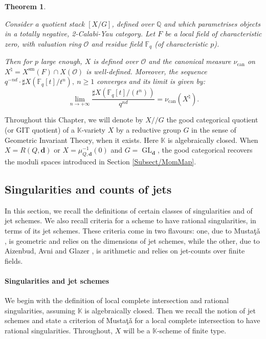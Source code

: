 \documentclass[11pt,english]{article}
\numberwithin{equation}{section}
\numberwithin{figure}{section}
\theoremstyle{definition}
\theoremstyle{plain}
\newtheorem{thm}[df]{Theorem}
\theoremstyle{remark}
\DeclareMathOperator{\GL}{GL}
\newcommand\dd{\mathbf{d}}
\newcommand\QQ{\mathbb{Q}}
\newcommand\FF{\mathbb{F}}
\newcommand\KK{\mathbb{K}}
\newcommand\git{/\!\!/}
\begin{document}
\begin{thm} \label{Thm/Ch3p-adicVol2CYMod}

Consider a quotient stack $[X/G]$, defined over $\QQ$ and which
parametrises objects in a totally negative, 2-Calabi-Yau category.
Let $F$ be a local field of characteristic zero, with valuation ring
$\mathcal{O}$ and residue field $\FF_{q}$ (of characteristic $p$).

Then for $p$ large enough, $X$ is defined over $\mathcal{O}$ and
the canonical measure $\nu_{\mathrm{can}}$ on $X^{\natural}=X^{\mathrm{sm}}(F)\cap X(\mathcal{O})$
is well-defined. Moreover, the sequence $q^{-nd}\cdot\sharp X(\mathbb{F}_{q}[t]/t^{n}),\ n\geq1$
converges and its limit is given by:\[
\underset{n\rightarrow +\infty}{\lim}\frac{\sharp X(\mathbb{F}_{q}[t]/(t^{n}))}{q^{nd}}
=
\nu_{\mathrm{can}}(X^{\natural}).
\]\end{thm}

Throughout this Chapter, we will denote by $X\git G$ the good categorical
quotient (or GIT quotient) \cite[\S 0.2, Rem. 6]{MFK94}\cite[\S 6.1.]{Dol03}
of a $\KK$-variety $X$ by a reductive group $G$ in the sense of
Geometric Invariant Theory, when it exists. Here $\KK$ is algebraically
closed. When $X=R(Q,\dd)$ or $X=\mu_{Q,\dd}^{-1}(0)$ and $G=\GL_{\dd}$,
the good categorical recovers the moduli spaces introduced in Section
\ref{Subsect/MomMap}. \index[notations]{x@$X\git G$ - good categorical quotient}

\subsection{Singularities and counts of jets \label{Subsect/Sing}}

In this section, we recall the definitions of certain classes of singularities
and of jet schemes. We also recall criteria for a scheme to have rational
singularities, in terms of its jet schemes. These criteria come in
two flavours: one, due to Musta\c{t}\v{a} \cite{Mus01}, is geometric
and relies on the dimensions of jet schemes, while the other, due
to Aizenbud, Avni and Glazer \cite{AA18,Gla19}, is arithmetic and
relies on jet-counts over finite fields.

\paragraph*{Singularities and jet schemes}

We begin with the definition of local complete intersection and rational
singularities, assuming $\KK$ is algebraically closed. Then we recall
the notion of jet schemes and state a criterion of Musta\c{t}\v{a}
\cite{Mus01} for a local complete intersection to have rational singularities.
Throughout, $X$ will be a $\KK$-scheme of finite type.
\end{document}
